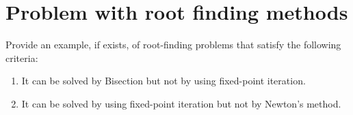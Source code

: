 







\section{Problem with root finding methods}
Provide an example, if exists, of root-finding problems that satisfy the following criteria:
\begin{enumerate}
	\item It can be solved by Bisection but not by using fixed-point iteration.
	\item It can be solved by using fixed-point iteration but not by Newton's method.
\end{enumerate}


